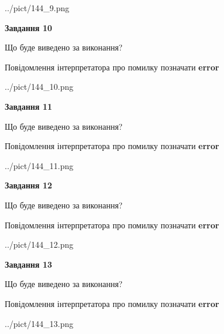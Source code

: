 \documentclass[11pt, ukrainian]{article}
\begin{document}
{\begin {large}
\begin{center}
	{../pict/144_9.png}
\end{center}
\newpage

{\begin {center}\textbf{Завдання 10}\end {center}}\par
Що буде виведено за виконання? \par
Повідомлення інтерпретатора про помилку позначати \textbf{error}

\begin{center}
	{../pict/144_10.png}
\end{center}
\newpage

{\begin {center}\textbf{Завдання 11}\end {center}}\par
Що буде виведено за виконання? \par
Повідомлення інтерпретатора про помилку позначати \textbf{error}

\begin{center}
	{../pict/144_11.png}
\end{center}
\newpage

{\begin {center}\textbf{Завдання 12}\end {center}}\par
Що буде виведено за виконання? \par
Повідомлення інтерпретатора про помилку позначати \textbf{error}

\begin{center}
	{../pict/144_12.png}
\end{center}
\newpage

{\begin {center}\textbf{Завдання 13}\end {center}}\par
Що буде виведено за виконання? \par
Повідомлення інтерпретатора про помилку позначати \textbf{error}

\begin{center}
	{../pict/144_13.png}
\end{center}
\newpage


\end{large}}
\end{document}
